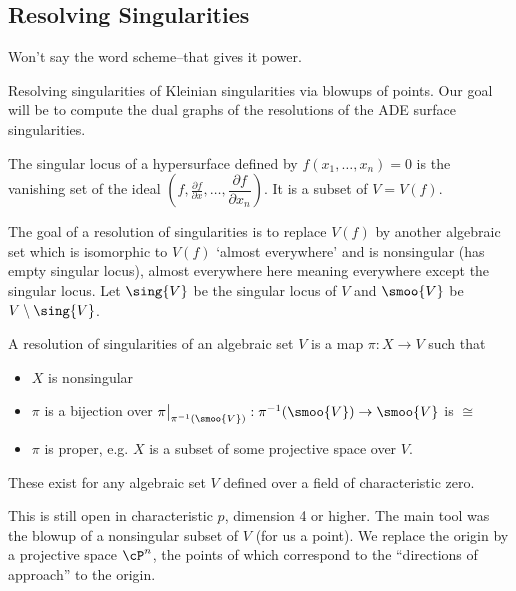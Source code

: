 \subsection{Resolving Singularities}

Won't say the word scheme--that gives it power.

Resolving singularities of Kleinian singularities via blowups of points. Our goal will be to compute the dual graphs of the resolutions of the ADE surface singularities. 


\begin{dfn}
The singular locus of a hypersurface defined by $f(x_1,\ldots,x_n)=0$ is the vanishing set of the ideal $(f, \frac{\partial f}{\partial x}, \ldots, \dfrac{\partial f}{\partial x_n})$. It is a subset of $V=V(f)$. 
\end{dfn}



The goal of a resolution of singularities is to replace $V(f)$ by another algebraic set which is isomorphic to $V(f)$ `almost everywhere' and is nonsingular (has empty singular locus), almost everywhere here meaning everywhere except the singular locus. Let $\sing{V}$ be the singular locus of $V$ and $\smoo{V}$ be $V \setminus \sing{V}$. 


\begin{dfn}
A resolution of singularities of an algebraic set $V$ is a map $\pi: X \to V$ such that 
	\begin{itemize}
	\item $X$ is nonsingular
	\item $\pi$ is a bijection over $\pi\big|_{\pi^{-1}(\smoo{V})}: \pi^{-1}(\smoo{V}) \to \smoo{V}$ is $\cong$
	\item $\pi$ is proper, e.g. $X$ is a subset of some projective space over $V$. 
	\end{itemize}
\end{dfn}


\begin{thm}[Hironaka, 1964]
These exist for any algebraic set $V$ defined over a field of characteristic zero. 
\end{thm}


This is still open in characteristic $p$, dimension 4 or higher. The main tool was the blowup of a nonsingular subset of $V$ (for us a point). We replace the origin by a projective space $\cP^n$, the points of which correspond to the ``directions of approach'' to the origin. 


